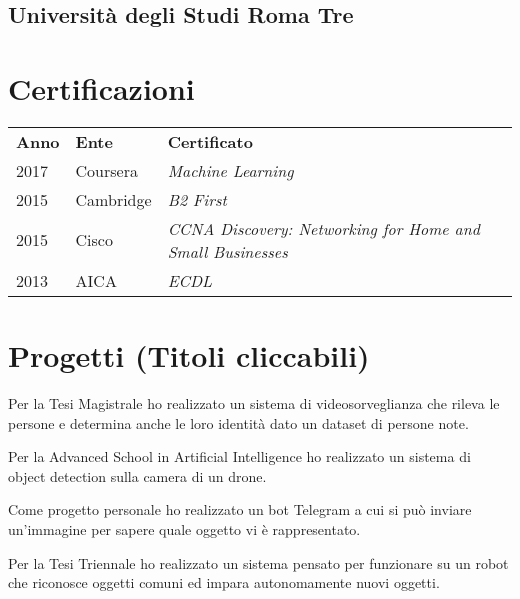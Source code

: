 \documentclass[]{deedy-resume-openfont}
\begin{document}
\begin{minipage}[t]{0.66\textwidth}
\subsection{Università degli Studi Roma Tre}
\sectionsep


\section{Certificazioni}
\begin{tabular}{@{}lll@{}}
\textbf{Anno} & \textbf{Ente} & \textbf{Certificato} \\
2017          & Coursera      & \textit{Machine Learning} \\
2015	      & Cambridge     & \textit{B2 First} \\
2015	      & Cisco         & \textit{CCNA Discovery: Networking for Home and Small Businesses} \\
2013	      & AICA          & \textit{ECDL} \\
\end{tabular}
\sectionsep


\section{Progetti (Titoli cliccabili)}

Per la Tesi Magistrale ho realizzato un sistema di videosorveglianza che rileva le persone e determina anche le loro identità dato un dataset di persone note.

Per la Advanced School in Artificial Intelligence ho realizzato un sistema di object detection sulla camera di un drone.

Come progetto personale ho realizzato un bot Telegram a cui si può inviare un'immagine per sapere quale oggetto vi è rappresentato.

Per la Tesi Triennale ho realizzato un sistema pensato per funzionare su un robot che riconosce oggetti comuni ed impara autonomamente nuovi oggetti.

\end{minipage} 
\end{document}
